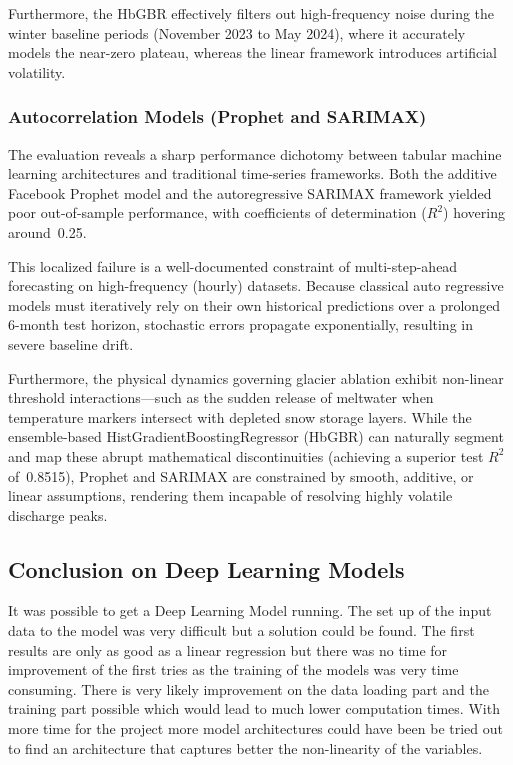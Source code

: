 \documentclass[a4paper,12pt]{article}
\begin{document}
Furthermore, the HbGBR effectively filters out high-frequency noise during the 
winter baseline periods (November 2023 to May 2024), where it accurately models the 
near-zero plateau, whereas the linear framework introduces artificial volatility.\\

\subsubsection{Autocorrelation Models (Prophet and SARIMAX)}

The evaluation reveals a sharp performance dichotomy between tabular machine learning 
architectures and traditional time-series frameworks. Both the additive Facebook Prophet 
model and the autoregressive SARIMAX framework yielded poor out-of-sample performance, 
with coefficients of determination ($R^2$) hovering around~0.25. 

This localized failure is a well-documented constraint of multi-step-ahead forecasting 
on high-frequency (hourly) datasets. Because classical auto regressive models must iteratively 
rely on their own historical predictions over a prolonged 6-month test horizon, 
stochastic errors propagate exponentially, resulting in severe baseline drift.

Furthermore, the physical dynamics governing glacier ablation exhibit non-linear 
threshold interactions---such as the sudden release of meltwater when temperature markers 
intersect with depleted snow storage layers. While the ensemble-based 
HistGradientBoostingRegressor (HbGBR) can naturally segment and map these abrupt mathematical 
discontinuities (achieving a superior test $R^2$ of~0.8515), Prophet and SARIMAX are constrained by smooth, additive, or linear assumptions, rendering them incapable of 
resolving highly volatile discharge peaks.

\subsection{Conclusion on Deep Learning Models}

It was possible to get a Deep Learning Model running. The set up of the input data to the model was very difficult  but a solution could be found. The first results are only as good as a linear regression but there was no time for improvement of the first tries as the training of the models was very time consuming. There is very likely improvement on the data loading part and the training part possible which would lead to much lower computation times. With more time for the project more model architectures could have been be tried out to find an architecture that captures better the non-linearity of the variables.
\end{document}
